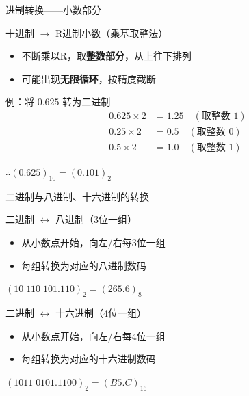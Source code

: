 \documentclass[10pt, aspectratio=169]{beamer}
\begin{document}
\begin{frame}{进制转换——小数部分}
    \begin{block}{十进制 $\to$ R进制小数（乘基取整法）}
        \begin{itemize}
            \item 不断乘以R，取\textbf{整数部分}，从上往下排列
            \item 可能出现\textbf{无限循环}，按精度截断
        \end{itemize}
    \end{block}
    \vspace{0.5em}
    \begin{exampleblock}{例：将 $0.625$ 转为二进制}
        \begin{align*}
            0.625 \times 2 &= 1.25 \quad (\text{取整数 } 1) \\
            0.25 \times 2  &= 0.5  \quad (\text{取整数 } 0) \\
            0.5 \times 2   &= 1.0  \quad (\text{取整数 } 1)
        \end{align*}
        \begin{center}
            $\therefore (0.625)_{10} = (0.101)_2$
        \end{center}
    \end{exampleblock}
\end{frame}

\begin{frame}{二进制与八进制、十六进制的转换}
    \begin{block}{二进制 $\leftrightarrow$ 八进制（3位一组）}
        \begin{itemize}
            \item 从小数点开始，向左/右每3位一组
            \item 每组转换为对应的八进制数码
        \end{itemize}
        \begin{center}
            $(10\;110\;101.110)_2 = (265.6)_8$
        \end{center}
    \end{block}
    \begin{block}{二进制 $\leftrightarrow$ 十六进制（4位一组）}
        \begin{itemize}
            \item 从小数点开始，向左/右每4位一组
            \item 每组转换为对应的十六进制数码
        \end{itemize}
        \begin{center}
            $(1011\;0101.1100)_2 = (B5.C)_{16}$
        \end{center}
    \end{block}
\end{frame}
\end{document}
